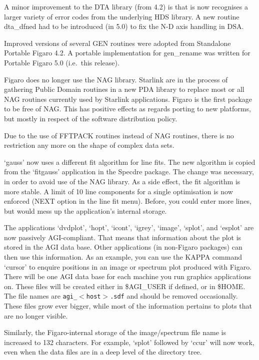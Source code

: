    A minor improvement to the DTA library (from 4.2) is that is now
   recognises a larger variety of error codes from the underlying HDS
   library. A new routine dta\_dfned had to be introduced (in 5.0) to fix
   the N-D axis handling in DSA.

   Improved versions of several GEN routines were adopted from
   Standalone Portable Figaro 4.2. A portable implementation for
   gen\_rename was written for Portable Figaro 5.0 (i.e.\ this release).


   Figaro does no longer use the NAG library. Starlink are in the
   process of gathering Public Domain routines in a new PDA library to
   replace most or all NAG routines currently used by Starlink
   applications. Figaro is the first package to be free of NAG. This has
   positive effects as regards porting to new platforms, but mostly in
   respect of the software distribution policy.

   Due to the use of FFTPACK routines instead of NAG routines, there is
   no restriction any more on the shape of complex data sets.

   `gauss' now uses a different fit algorithm for line fits. The new
   algorithm is copied from the `fitgauss' application in the Specdre
   package. The change was necessary, in order to avoid use of the NAG
   library. As a side effect, the fit algorithm is more stable. A
   limit of 10 line components for a single optimisation is now enforced
   (NEXT option in the line fit menu). Before, you could enter more
   lines, but would mess up the application's internal storage.


   The applications `dvdplot', `hopt', `icont', `igrey', `image',
   `splot', and `esplot' are now passively AGI-compliant. That means
   that information about the plot is stored in the AGI data
   base. Other applications (in non-Figaro packages) can then use this
   information. As an example, you can use the KAPPA command `cursor' to
   enquire positions in an image or spectrum plot produced with Figaro.
   There will be one AGI data base for each machine you run graphics
   applications on. These files will be created either in \$AGI\_USER if
   defined, or in \$HOME. The file names are {\tt agi\_$<$host$>$.sdf}
   and should be removed occasionally. These files grow ever bigger,
   while most of the information pertains to plots that are no longer
   visible.

   Similarly, the Figaro-internal storage of the image/spectrum file
   name is increased to 132 characters. For example, `splot' followed by
   `ccur' will now work, even when the data files are in a deep level of
   the directory tree.


